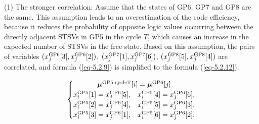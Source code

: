 \documentclass[lettersize,journal]{IEEEtran}
\begin{document}
(1) The stronger correlation: Assume that the states of GP6, GP7 and GP8 are the same. This assumption leads to an overestimation of the code efficiency, because it reduces the probability of opposite logic values occurring between the directly adjacent STSVs in GP5 in the cycle $T$, which causes an increase in the expected number of STSVs in the free state. Based on this assumption, the pairs of variables $(x_j^{\rm GP6}[3], x_j^{\rm GP6}[2])$, $(x_j^{\rm GP7} [1], x_j^{\rm GP7}[6])$, $(x_j^{\rm GP8}[5], x_j^{\rm GP8}[4])$ are correlated, and formula (\ref{eq-5.2.9}) is simplified to the formula (\ref{eq-5.2.12}).


\begin{equation}
	\begin{cases}
		\multicolumn{2}{c}{\boldsymbol{\mu}^{\rm GP5,cycleT}[i] = \boldsymbol{\mu}^{\rm GP6}[j]} \\
		x_i^{\rm GP5}[1] = x_j^{\rm GP6}[5], & x_i^{\rm GP5}[4] = x_j^{\rm GP6}[6], \\
		x_i^{\rm GP5}[2] = x_j^{\rm GP6}[4], & x_i^{\rm GP5}[5] = x_j^{\rm GP6}[3], \\
		x_i^{\rm GP5}[3] = x_j^{\rm GP6}[1], & x_i^{\rm GP5}[6] = x_j^{\rm GP6}[2].
	\end{cases}
	\label{eq-5.2.12}
\end{equation}

\end{document}
